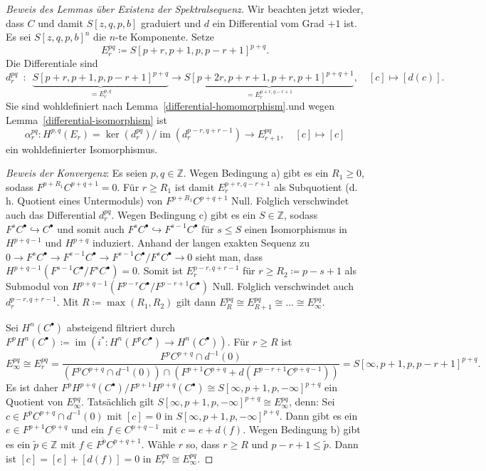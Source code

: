 \documentclass[11pt, a4paper, german]{article}
\theoremstyle{definition}
\theoremstyle{remark}
\newcommand{\Z}{\mathbb{Z}} %
\DeclareMathOperator{\im}{im} %
\renewcommand{\dh}{d.\,h.} %
\begin{document}
\begin{proof}[Beweis des Lemmas über Existenz der Spektralsequenz]
  Wir beachten jetzt wieder, dass $C$ und damit $S[z, q, p, b]$ graduiert und $d$ ein Differential vom Grad $+1$ ist.
  Es sei $S[z, q, p, b]^n$ die $n$-te Komponente.
  Setze
  \[ E_r^{pq} \coloneqq S[p\!+\!r, p\!+\!1, p, p\!-\!r\!+\!1]^{p+q}. \]
  Die Differentiale sind
  \[
    d_r^{pq}
    \enspace : \enspace
    \underbrace{S[p\!+\!r, p\!+\!1, p, p\!-\!r\!+\!1]^{p+q}}_{= E_r^{p,q}} \to \underbrace{S[p\!+\!2r, p\!+\!r\!+\!1, p\!+\!r, p\!+\!1]^{p+q+1}}_{= E_r^{p+r,q-r+1}}, \quad
    [c] \mapsto [d(c)].
  \]
  Sie sind wohldefiniert nach Lemma~\ref{differential-homomorphism}.und
  wegen Lemma~\ref{differential-isomorphism} ist
  \[
    \alpha_r^{pq} : H^{p,q}(E_r) = \ker(d^{pq}_r) / \im(d^{p-r,q+r-1}_r) \to E_{r+1}^{pq}, \quad
    [c] \mapsto [c]
  \]
  ein wohldefinierter Isomorphismus.

  \emph{Beweis der Konvergenz}:
  Es seien $p, q \in \Z$.
  Wegen Bedingung a) gibt es ein $R_1 \geq 0$, sodass $F^{p+R_1} C^{p+q+1} = 0$.
  Für $r \geq R_1$ ist damit $E^{p+r,q-r+1}_r$ als Subquotient (\dh{} Quotient eines Untermoduls) von $F^{p+R_1} C^{p+q+1}$ Null.
  Folglich verschwindet auch das Differential $d_r^{pq}$.
  Wegen Bedingung c) gibt es ein $S \in \Z$, sodass $F^s C^\bullet \hookrightarrow C^\bullet$ und somit auch $F^s C^\bullet \hookrightarrow F^{s-1} C^\bullet$ für $s \leq S$ einen Isomorphismus in $H^{p+q-1}$ und $H^{p+q}$ induziert.
  Anhand der langen exakten Sequenz zu $0 \to F^s C^\bullet \to F^{s-1} C^\bullet \to F^{s-1} C^\bullet / F^s C^\bullet \to 0$ sieht man, dass $H^{p+q-1}(F^{s-1} C^\bullet / F^s C^\bullet) = 0$.
  Somit ist $E_r^{p-r,q+r-1}$ für $r \geq R_2 \coloneqq p - s + 1$ als Submodul von $H^{p+q-1}(F^{p-r} C^\bullet / F^{p-r+1} C^\bullet)$ Null.
  Folglich verschwindet auch $d_r^{p-r,q+r-1}$.
  Mit $R \coloneqq \max(R_1, R_2)$ gilt dann $E^{pq}_R \cong E^{pq}_{R+1} \cong \ldots \cong E^{pq}_\infty$.

  Sei $H^n(C^\bullet)$ absteigend filtriert durch $F^p H^n(C^\bullet) \coloneqq \im(i^* : H^n(F^p C^\bullet) \to H^n(C^\bullet))$.
  Für $r \geq R$ ist
  \[ E^{pq}_\infty \cong E^{pq}_r = \frac{F^p C^{p+q} \cap d^{-1}(0)}{(F^p C^{p+q} \cap d^{-1}(0)) \cap (F^{p+1} C^{p+q} + d(F^{p-r+1} C^{p+q-1}))} = S[\infty,p+1,p,p-r+1]^{p+q}. \]
  Es ist daher $F^p H^{p+q}(C^\bullet) / F^{p+1} H^{p+q}(C^\bullet) \cong S[\infty, p+1, p, -\infty]^{p+q}$ ein Quotient von $E^{pq}_\infty$.
  Tatsächlich gilt $S[\infty, p+1, p, -\infty]^{p+q} \cong E^{pq}_\infty$, denn:
  Sei $c \in F^p C^{p+q} \cap d^{-1}(0)$ mit $[c] = 0$ in $S[\infty, p+1, p, -\infty]^{p+q}$.
  Dann gibt es ein $e \in F^{p+1} C^{p+q}$ und ein $f \in C^{p+q-1}$ mit $c = e + d(f)$.
  Wegen Bedingung b) gibt es ein $\tilde{p} \in \Z$ mit $f \in F^{\tilde{p}} C^{p+q+1}$.
  Wähle $r$ so, dass $r \geq R$ und $p-r+1 \leq \tilde{p}$.
  Dann ist $[c] = [e]+[d(f)] = 0$ in $E^{pq}_r \cong E^{pq}_\infty$.
\end{proof}
\end{document}
